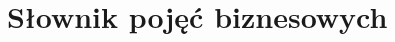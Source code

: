 \documentclass[paper=a4, fontsize=12pt]{scrartcl}
\numberwithin{equation}{section}		%
\numberwithin{figure}{section}			%
\numberwithin{table}{section}				%
\begin{document}
% 	











\section{Słownik pojęć biznesowych}
	
\end{document}
